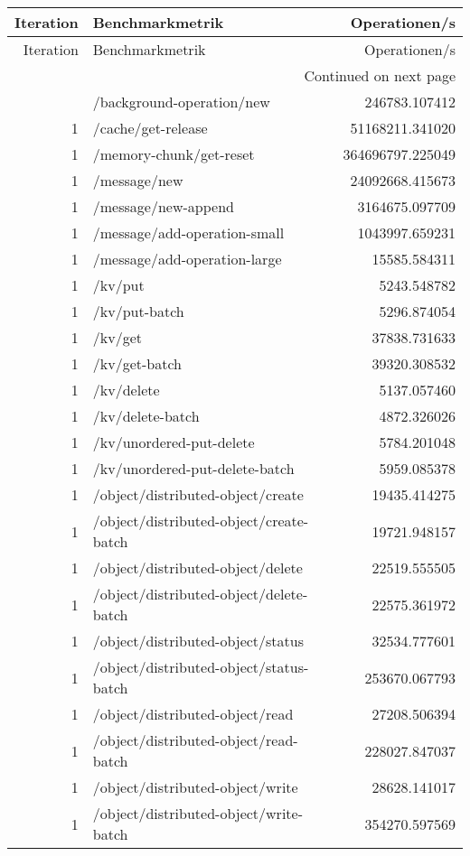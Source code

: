 \begin{longtable}{rlr}
\toprule
Iteration & Benchmarkmetrik & Operationen/s \\
\midrule
\endfirsthead
\toprule
Iteration & Benchmarkmetrik & Operationen/s \\
\midrule
\endhead
\midrule
\multicolumn{3}{r}{Continued on next page} \\
\midrule
\endfoot
\bottomrule
\endlastfoot
1 & /background-operation/new & 246783.107412 \\
1 & /cache/get-release & 51168211.341020 \\
1 & /memory-chunk/get-reset & 364696797.225049 \\
1 & /message/new & 24092668.415673 \\
1 & /message/new-append & 3164675.097709 \\
1 & /message/add-operation-small & 1043997.659231 \\
1 & /message/add-operation-large & 15585.584311 \\
1 & /kv/put & 5243.548782 \\
1 & /kv/put-batch & 5296.874054 \\
1 & /kv/get & 37838.731633 \\
1 & /kv/get-batch & 39320.308532 \\
1 & /kv/delete & 5137.057460 \\
1 & /kv/delete-batch & 4872.326026 \\
1 & /kv/unordered-put-delete & 5784.201048 \\
1 & /kv/unordered-put-delete-batch & 5959.085378 \\
1 & /object/distributed-object/create & 19435.414275 \\
1 & /object/distributed-object/create-batch & 19721.948157 \\
1 & /object/distributed-object/delete & 22519.555505 \\
1 & /object/distributed-object/delete-batch & 22575.361972 \\
1 & /object/distributed-object/status & 32534.777601 \\
1 & /object/distributed-object/status-batch & 253670.067793 \\
1 & /object/distributed-object/read & 27208.506394 \\
1 & /object/distributed-object/read-batch & 228027.847037 \\
1 & /object/distributed-object/write & 28628.141017 \\
1 & /object/distributed-object/write-batch & 354270.597569 \\

\end{longtable}
